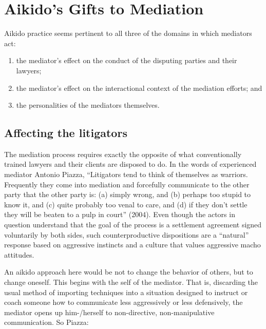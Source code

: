 \section*{Aikido's Gifts to Mediation}

Aikido practice seems pertinent to all three of the domains in which mediators act: 

\begin{enumerate}
\item the mediator's effect on the conduct of the disputing parties and their lawyers;
\item the mediator's effect on the interactional context of the mediation efforts; and
\item the personalities of the mediators themselves.
\end{enumerate}

\subsection*{Affecting the litigators}

The mediation process requires exactly the opposite of what conventionally trained lawyers and their clients are disposed to do. In the words of experienced mediator Antonio Piazza, ``Litigators tend to think of themselves as warriors. Frequently they come into mediation and forcefully communicate to the other party that the other party is: (a) simply wrong, and (b) perhaps too stupid to know it, and (c) quite probably too venal to care, and (d) if they don't settle they will be beaten to a pulp in court'' (2004). Even though the actors in question understand that the goal of the process is a settlement agreement signed voluntarily by both sides, such counterproductive dispositions are a ``natural'' response based on aggressive instincts and a culture that values aggressive macho attitudes. 

An aikido approach here would be not to change the behavior of others, but to change oneself. This begins with the self of the mediator. That is, discarding the usual method of importing techniques into a situation designed to instruct or coach someone how to communicate less aggressively or less defensively, the mediator opens up him-/herself to non-directive, non-manipulative communication. So Piazza:

